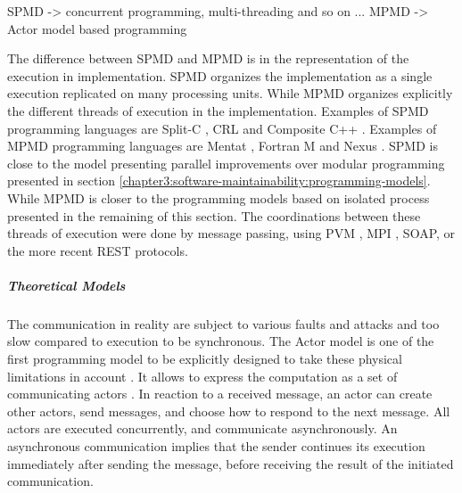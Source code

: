 

SPMD -> concurrent programming, multi-threading and so on ...
MPMD -> Actor model based programming

The difference between SPMD and MPMD is in the representation of the execution in implementation.
SPMD organizes the implementation as a single execution replicated on many processing units.
While MPMD organizes explicitly the different threads of execution in the implementation.
Examples of SPMD programming languages are
Split-C \cite{Culler},
CRL \cite{Johnson1995} and
Composite C++ \cite{K.ManiChandy2005}.
%
Examples of MPMD programming languages are
Mentat \cite{Grimshaw1991},
Fortran M \cite{Foster1995b} and
Nexus \cite{Foster1996}.
SPMD is close to the model presenting parallel improvements over modular programming presented in section \ref{chapter3:software-maintainability:programming-models}.
While MPMD is closer to the programming models based on isolated process presented in the remaining of this section.
The coordinations between these threads of execution were done by message passing, using PVM \cite{Sunderam1994}, MPI \cite{Snir1996,Walker1996}, SOAP, or the more recent REST protocols.

\subparagraph{Theoretical Models}

The communication in reality are subject to various faults and attacks \cite{Lamport1982} and too slow compared to execution to be synchronous.
The Actor model is one of the first programming model to be explicitly designed to take these physical limitations in account \cite{Hewitt1977a}.
It allows to express the computation as a set of communicating actors \cite{Hewitt1973a, Hewitt1977, Clinger1981}.
In reaction to a received message, an actor can create other actors, send messages, and choose how to respond to the next message.
All actors are executed concurrently, and communicate asynchronously.
An asynchronous communication implies that the sender continues its execution immediately after sending the message, before receiving the result of the initiated communication.

